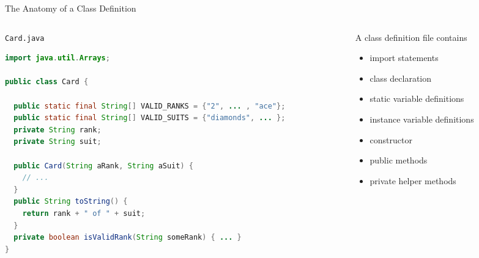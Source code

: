 \documentclass{beamer}
\begin{document}
\begin{frame}[fragile]{The Anatomy of a Class Definition}

\vspace{-.1in}
\begin{columns}[t]
\begin{column}{6.5cm}
{\tt Card.java}

\begin{lstlisting}[language=Java]
import java.util.Arrays;

public class Card {
  
  public static final String[] VALID_RANKS = {"2", ... , "ace"};
  public static final String[] VALID_SUITS = {"diamonds", ... };
  private String rank;
  private String suit;

  public Card(String aRank, String aSuit) {
    // ...
  }
  public String toString() {
    return rank + " of " + suit;
  }
  private boolean isValidRank(String someRank) { ... }
}
\end{lstlisting}
\end{column}

\begin{column}{5.5cm}
A class definition file contains
\vspace{.05in}
\begin{itemize}
\item import statements
\vspace{.05in}
\item class declaration
\vspace{.04in}
\item static variable definitions
\vspace{.27in}
\item instance variable definitions
\vspace{.03in}
\item constructor
\vspace{.25in}
\item public methods
\vspace{.23in}
\item private helper methods
\end{itemize}
\end{column}
\end{columns}


\end{frame}
\end{document}
